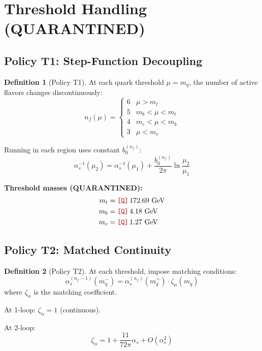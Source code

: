 \documentclass[11pt,a4paper]{article}
\newcommand{\Qnum}[1]{\textcolor{red!70!black}{\texttt{[Q]}}\,#1}
\theoremstyle{definition}
\newtheorem{definition}{Definition}[section]
\begin{document}
\section{Threshold Handling (QUARANTINED)}
\label{sec:thresholds}

\begin{quarantinebox}
\end{quarantinebox}

\subsection{Policy T1: Step-Function Decoupling}
\label{subsec:policy-t1}

\begin{definition}[Policy T1]
\label{def:policy-t1}
At each quark threshold $\mu = m_q$, the number of active flavors changes
discontinuously:
\begin{equation}
\label{eq:t1-nf-change}
n_f(\mu) = \begin{cases}
6 & \mu > m_t \\
5 & m_b < \mu < m_t \\
4 & m_c < \mu < m_b \\
3 & \mu < m_c
\end{cases}
\end{equation}

Running in each region uses constant $b_0^{(n_f)}$:
\begin{equation}
\label{eq:t1-running}
\alpha_s^{-1}(\mu_2) = \alpha_s^{-1}(\mu_1) + \frac{b_0^{(n_f)}}{2\pi}\ln\frac{\mu_2}{\mu_1}
\end{equation}
\end{definition}

\textbf{Threshold masses (QUARANTINED):}
\begin{align}
\label{eq:t1-mt}
m_t &= \Qnum{172.69} \text{ GeV} \\
\label{eq:t1-mb}
m_b &= \Qnum{4.18} \text{ GeV} \\
\label{eq:t1-mc}
m_c &= \Qnum{1.27} \text{ GeV}
\end{align}

\subsection{Policy T2: Matched Continuity}
\label{subsec:policy-t2}

\begin{definition}[Policy T2]
\label{def:policy-t2}
At each threshold, impose matching conditions:
\begin{equation}
\label{eq:t2-matching}
\alpha_s^{(n_f-1)}(m_q^-) = \alpha_s^{(n_f)}(m_q^+) \cdot \zeta_\alpha(m_q)
\end{equation}
where $\zeta_\alpha$ is the matching coefficient.

At 1-loop: $\zeta_\alpha = 1$ (continuous).

At 2-loop:
\begin{equation}
\label{eq:t2-zeta}
\zeta_\alpha = 1 + \frac{11}{72\pi}\alpha_s + O(\alpha_s^2)
\end{equation}
\end{definition}
\end{document}
